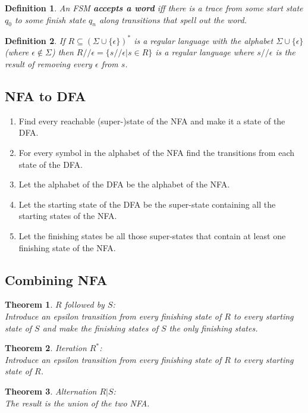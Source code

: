 \documentclass{article}
\theoremstyle{sltheorem}
\newtheorem{definition}{Definition}
\newtheorem{theorem}{Theorem}
\begin{document}
\begin{definition}
    An FSM \textbf{accepts a word} iff there is a trace from some start state $q_0$ to some finish state $q_n$ along transitions that spell out the word.
\end{definition}
\begin{definition}
    If $R\subseteq(\Sigma\cup\{\epsilon\})^*$ is a regular language with the alphabet $\Sigma\cup\{\epsilon\}$ (where $\epsilon\not\in\Sigma$) then $R//\epsilon=\{s//\epsilon|s\in R\}$ is a regular language where $s//\epsilon$ is the result of removing every $\epsilon$ from $s$.
\end{definition}
\subsection{NFA to DFA}
\begin{enumerate}
    \item Find every reachable (super-)state of the NFA and make it a state of the DFA.
    \item For every symbol in the alphabet of the NFA find the transitions from each state of the DFA.
    \item Let the alphabet of the DFA be the alphabet of the NFA.
    \item Let the starting state of the DFA be the super-state containing all the starting states of the NFA.
    \item Let the finishing states be all those super-states that contain at least one finishing state of the NFA.
\end{enumerate}
\subsection{Combining NFA}
\begin{theorem}
    $R$ followed by $S$:\\
    Introduce an epsilon transition from every finishing state of $R$ to every starting state of $S$ and make the finishing states of $S$ the only finishing states.
\end{theorem}
\begin{theorem}
    Iteration $R^*$:\\
    Introduce an epsilon transition from every finishing state of $R$ to every starting state of $R$.
\end{theorem}
\begin{theorem}
    Alternation $R|S$:\\
    The result is the union of the two NFA.
\end{theorem}
\end{document}
